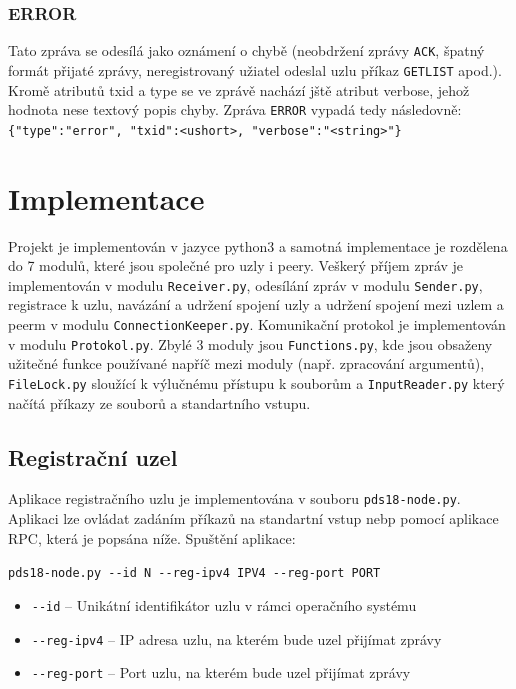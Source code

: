 \documentclass[11pt,a4paper,titlepage]{article}
\begin{document}
            \subsubsection{ERROR}
                Tato zpráva se odesílá jako oznámení o chybě (neobdržení zprávy \texttt{ACK}, špatný formát přijaté zprávy, neregistrovaný užiatel
                odeslal uzlu příkaz \texttt{GETLIST} apod.). Kromě atributů txid a type se ve zprávě nachází jště atribut verbose, jehož
                hodnota nese textový popis chyby. Zpráva \texttt{ERROR} vypadá tedy následovně: \verb+{"type":"error", "txid":<ushort>, "verbose":"<string>"}+

    \section{Implementace}
        Projekt je implementován v jazyce python3 a samotná implementace je rozdělena do 7 modulů, které jsou společné pro uzly i peery.
        Veškerý příjem zpráv je implementován v modulu \texttt{Receiver.py}, odesílání zpráv v modulu \texttt{Sender.py}, registrace k uzlu,
        navázání a udržení spojení uzly a udržení spojení mezi uzlem a peerm v modulu \texttt{ConnectionKeeper.py}. Komunikační protokol je
        implementován v modulu \texttt{Protokol.py}. Zbylé 3 moduly jsou \texttt{Functions.py},
        kde jsou obsaženy užitečné funkce používané napříč mezi moduly (např. zpracování argumentů), \texttt{FileLock.py} sloužící k výlučnému přístupu
        k souborům a \texttt{InputReader.py} který načítá příkazy ze souborů a standartního vstupu.

        \subsection{Registrační uzel}
            Aplikace registračního uzlu je implementována v souboru \texttt{pds18-node.py}. Aplikaci lze ovládat zadáním příkazů na
            standartní vstup nebp pomocí aplikace RPC, která je popsána níže. Spuštění aplikace:


            \fontsize{11pt}{12pt}\verb+pds18-node.py --id N --reg-ipv4 IPV4 --reg-port PORT+
            \begin{itemize}
                \item \verb+--id+ -- Unikátní identifikátor uzlu v rámci operačního systému
                \item \verb+--reg-ipv4+ -- IP adresa uzlu, na kterém bude uzel přijímat zprávy
                \item \verb+--reg-port+ -- Port uzlu, na kterém bude uzel přijímat zprávy
            \end{itemize}
\end{document}
